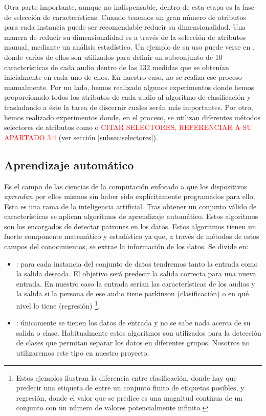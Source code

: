 Otra parte importante, aunque no indispensable, dentro de esta etapa es la fase de selección de características. Cuando tenemos un gran número de atributos para cada instancia puede ser recomendable reducir su dimensionalidad. Una manera de reducir su dimensionalidad es a través de la selección de atributos manual, mediante un análisis estadístico. Un ejemplo de su uso puede verse en \cite{MxLtNovel}, donde varios de ellos son utilizados para definir un subconjunto de 10 características de cada audio dentro de las 132 medidas que se obtenían inicialmente en cada uno de ellos. En nuestro caso, no se realiza ese proceso manualmente. Por un lado, hemos realizado algunos experimentos donde hemos proporcionado todos los atributos de cada audio al algoritmo de clasificación y trasladando a éste la tarea de discernir cuales serán más importantes. Por otro, hemos realizado experimentos donde, en el proceso, se utilizan diferentes métodos selectores de atributos como  o  \textcolor{red}{CITAR SELECTORES, REFERENCIAR A SU APARTADO 3.4} (ver sección \ref{subsec:selectores}). \cite{DMprocess}

\subsection{Aprendizaje automático}
Es el campo de las ciencias de la computación enfocado a que los dispositivos \textit{aprendan} por ellos mismos sin haber sido explícitamente programados para ello. Esta es una rama de la inteligencia artificial. Tras obtener un conjunto válido de características se aplican algoritmos de aprendizaje automático. Estos algoritmos son los encargados de detectar patrones en los datos. Estos algoritmos tienen un fuerte componente matemático y estadístico ya que, a través de métodos de estos campos del conocimientos, se extrae la información de los datos. Se divide en:
\begin{itemize}
	\item {}: para cada instancia del conjunto de datos tendremos tanto la entrada como la salida deseada. El objetivo será predecir la salida correcta para una nueva entrada. En nuestro caso la entrada serían las características de los audios y la salida si la persona de ese audio tiene parkinson (clasificación) o en qué nivel lo tiene (regresión) \footnote{Estos ejemplos ilustran la diferencia entre clasificación, donde hay que predecir una etiqueta de entre un conjunto finito de etiquetas posibles, y regresión, donde el valor que se predice es una magnitud continua de un conjunto con un número de valores potencialmente infinito.}.
	\item {}: únicamente se tienen los datos de entrada y no se sabe nada acerca de su salida o clase. Habitualmente estos algoritmos son utilizados para la detección de clases que permitan separar los datos en diferentes grupos. Nosotros no utilizaremos este tipo en nuestro proyecto.
\end{itemize}

